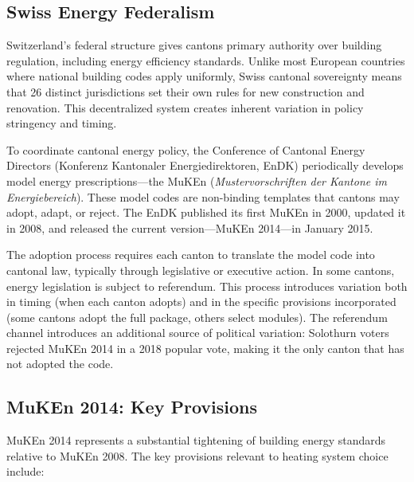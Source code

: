 \documentclass[12pt]{article}
\begin{document}
\subsection{Swiss Energy Federalism}

Switzerland's federal structure gives cantons primary authority over building regulation, including energy efficiency standards. Unlike most European countries where national building codes apply uniformly, Swiss cantonal sovereignty means that 26 distinct jurisdictions set their own rules for new construction and renovation. This decentralized system creates inherent variation in policy stringency and timing.

To coordinate cantonal energy policy, the Conference of Cantonal Energy Directors (Konferenz Kantonaler Energiedirektoren, EnDK) periodically develops model energy prescriptions---the MuKEn (\textit{Mustervorschriften der Kantone im Energiebereich}). These model codes are non-binding templates that cantons may adopt, adapt, or reject. The EnDK published its first MuKEn in 2000, updated it in 2008, and released the current version---MuKEn 2014---in January 2015.

The adoption process requires each canton to translate the model code into cantonal law, typically through legislative or executive action. In some cantons, energy legislation is subject to referendum. This process introduces variation both in timing (when each canton adopts) and in the specific provisions incorporated (some cantons adopt the full package, others select modules). The referendum channel introduces an additional source of political variation: Solothurn voters rejected MuKEn 2014 in a 2018 popular vote, making it the only canton that has not adopted the code.

\subsection{MuKEn 2014: Key Provisions}

MuKEn 2014 represents a substantial tightening of building energy standards relative to MuKEn 2008. The key provisions relevant to heating system choice include:
\end{document}

